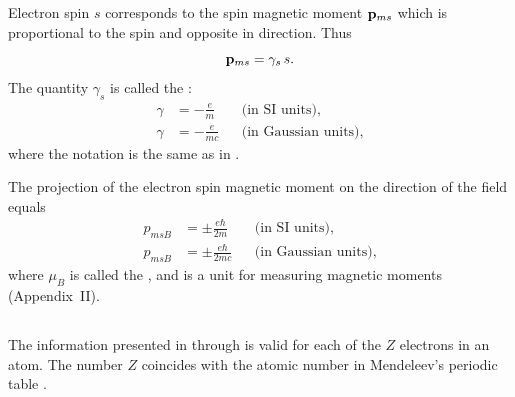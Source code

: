 \subsection{}\label{26.1.4} Electron spin $s$ corresponds to the spin magnetic moment $\vb{p}_{ms}$ which is proportional to the spin and opposite in direction. Thus
\begin{equation*}%
\vb{p}_{ms} = \gamma_{s}\,s.
\end{equation*}
The quantity $\gamma_{s}$ is called the :
\begin{align*}%
\gamma & = - \frac{e}{m} && \text{(in SI units),} \\
\gamma & =  - \frac{e}{mc} && \text{(in Gaussian units)},
\end{align*}
where the notation is the same as in .


The projection of the electron spin magnetic moment on the direction of the field  equals
\begin{align*}%
p_{msB} & = \pm \frac{e \hbar}{2m} && \text{(in SI units),} \\
p_{msB} & =  \pm \frac{e \hbar}{2mc} && \text{(in Gaussian units)},
\end{align*}
where $\mu_{B}$ is called the , and is a unit for measuring magnetic moments (Appendix~II).

\subsection{}\label{26.1.5} The information presented in  through  is valid for each of the $Z$ electrons in an atom. The number $Z$ coincides with the atomic number in Mendeleev's periodic table .

